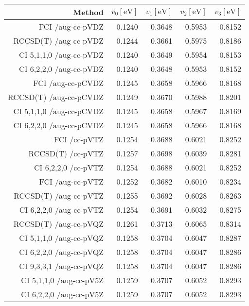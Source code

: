 \begin{tabular}{rrrrr}
\toprule
Method & $v_0 [\mathrm{eV}]$ & $v_1 [\mathrm{eV}]$ & $v_2 [\mathrm{eV}]$ & $v_3[\mathrm{eV}]$ \\ \midrule
    FCI  /aug-cc-pVDZ & 0.1240 & 0.3648 & 0.5953 & 0.8152\\
RCCSD(T)  /aug-cc-pVDZ & 0.1244 & 0.3661 & 0.5975 & 0.8186\\
CI 5,1,1,0 /aug-cc-pVDZ & 0.1240 & 0.3649 & 0.5954 & 0.8153\\
CI 6,2,2,0 /aug-cc-pVDZ & 0.1240 & 0.3648 & 0.5953 & 0.8152\\
FCI  /aug-cc-pCVDZ & 0.1245 & 0.3658 & 0.5966 & 0.8168\\
RCCSD(T)  /aug-cc-pCVDZ & 0.1249 & 0.3670 & 0.5988 & 0.8201\\
CI 5,1,1,0 /aug-cc-pCVDZ & 0.1245 & 0.3658 & 0.5967 & 0.8169\\
CI 6,2,2,0 /aug-cc-pCVDZ & 0.1245 & 0.3658 & 0.5966 & 0.8168\\
FCI  /cc-pVTZ & 0.1254 & 0.3688 & 0.6021 & 0.8252\\
RCCSD(T)  /cc-pVTZ & 0.1257 & 0.3698 & 0.6039 & 0.8281\\
CI 6,2,2,0 /cc-pVTZ & 0.1254 & 0.3688 & 0.6021 & 0.8252\\
FCI  /aug-cc-pVTZ & 0.1252 & 0.3682 & 0.6010 & 0.8234\\
RCCSD(T)  /aug-cc-pVTZ & 0.1255 & 0.3692 & 0.6028 & 0.8263\\
CI 6,2,2,0 /aug-cc-pVTZ & 0.1254 & 0.3691 & 0.6032 & 0.8275\\
RCCSD(T)  /aug-cc-pVQZ & 0.1261 & 0.3713 & 0.6065 & 0.8314\\
CI 5,1,1,0 /aug-cc-pVQZ & 0.1258 & 0.3704 & 0.6047 & 0.8287\\
CI 6,2,2,0 /aug-cc-pVQZ & 0.1258 & 0.3704 & 0.6047 & 0.8286\\
CI 9,3,3,1 /aug-cc-pVQZ & 0.1258 & 0.3704 & 0.6047 & 0.8286\\
CI 5,1,1,0 /aug-cc-pV5Z & 0.1259 & 0.3707 & 0.6052 & 0.8293\\
CI 6,2,2,0 /aug-cc-pV5Z & 0.1259 & 0.3707 & 0.6052 & 0.8293\\
\bottomrule
\end{tabular}
    